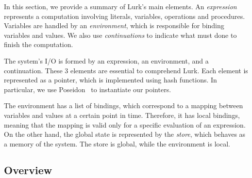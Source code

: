\documentclass[10pt, english]{article}
\begin{document}
In this section, we provide a summary of Lurk's main elements. An \textit{expression} represents a computation involving literals, variables, operations and procedures. Variables are handled by an \textit{environment}, which is responsible for binding variables and values. We also use \textit{continuations} to indicate what must done to finish the computation.

The system's I/O is formed by an expression, an environment, and a continuation. These 3 elements are essential to comprehend Lurk. Each element is represented as a pointer, which is implemented using hash functions. In particular, we use Poseidon~\cite{poseidon} to instantiate our pointers.

The environment has a list of bindings, which correspond to a mapping between variables and values at a certain point in time. Therefore, it has local bindings, meaning that the mapping is valid only for a specific evaluation of an expression. On the other hand, the global state is represented by the \textit{store}, which behaves as a memory of the system. The store is global, while the environment is local.

\subsection{Overview}
\end{document}
